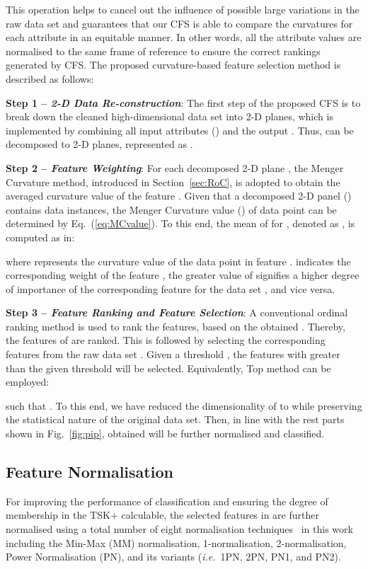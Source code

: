 \documentclass{article}
\newcommand{\zzie}{\emph{i.e.}~}
\newcommand*{\1}{\textcolor{red}}
\begin{document}
This operation helps to cancel out the influence of possible large variations in the raw data set and guarantees that our CFS is able to compare the curvatures for each attribute in an equitable manner. In other words, all the attribute values are normalised to the same frame of reference to ensure the correct rankings generated by CFS. The proposed curvature-based feature selection method is described as follows:


\textbf{Step 1 -- \textit{2-D Data Re-construction}}: The first step of the proposed CFS is to break down the cleaned high-dimensional data set  into  2-D planes, which is implemented by combining all input attributes  () and the output . Thus,  can be decomposed to  2-D planes, represented as . 

\textbf{Step 2 -- \textit{Feature Weighting}}: For each decomposed 2-D plane , the Menger Curvature method, introduced in Section~\ref{sec:RoC}, is adopted to obtain the averaged curvature value of the feature . Given that a decomposed 2-D panel () contains  data instances, the Menger Curvature value () of data point   can be determined by Eq.~(\ref{eq:MCvalue}). To this end, the mean of  for , denoted as , is computed as in:

where  represents the curvature value of the  data point in feature .  indicates the corresponding weight of the feature , the greater value of  signifies a higher degree of importance of the corresponding feature  for the data set , and vice versa. 

\textbf{Step 3 -- \textit{Feature Ranking and Feature Selection}}: A conventional ordinal ranking method is used to rank the features, based on the obtained . Thereby, the features of  are ranked. This is followed by selecting the corresponding features from the raw data set . Given a threshold , the features with  greater than the given threshold  will be selected. Equivalently, Top method can be employed:

such that . To this end, we have reduced the dimensionality of  to  while preserving the statistical nature of the original data set. Then, in line with the rest parts shown in Fig.~\ref{fig:pip}, obtained  will be further normalised and classified.

\subsection{Feature Normalisation} \label{sec:featNorm}
For improving the performance of classification and ensuring the degree of membership in the TSK+ calculable,
the selected features in  are further normalised using a total number of eight normalisation techniques~\cite{8858838} in this work including the Min-Max (MM) normalisation, 1-normalisation, 2-normalisation, Power Normalisation (PN), and its variants (\zzie 1PN, 2PN, PN1, and PN2).
\end{document}
